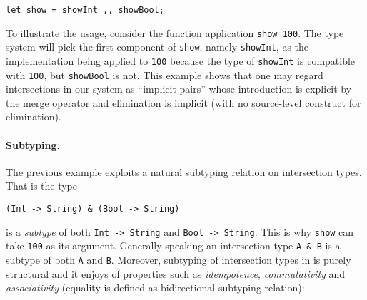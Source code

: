 \begin{lstlisting}
let show = showInt ,, showBool;
\end{lstlisting}

To illustrate the usage, consider the function application \lstinline{show 100}.
The type system will pick the first component of \lstinline{show}, namely
\lstinline{showInt}, as the implementation being applied to \lstinline{100}
because the type of \lstinline{showInt} is compatible with \lstinline{100}, but
\lstinline{showBool} is not. This example shows that one may regard
intersections in our system as ``implicit pairs'' whose introduction is explicit
by the merge operator and elimination is implicit (with no source-level
construct for elimination).








\paragraph{Subtyping.} The previous example exploits a natural
subtyping relation on intersection types. That is the type

\begin{lstlisting}
(Int -> String) & (Bool -> String)
\end{lstlisting}

\noindent is a \emph{subtype} of both \lstinline{Int -> String} and
\lstinline{Bool -> String}. This is why \lstinline{show} can take
\lstinline{100} as its argument. Generally speaking an intersection type
\lstinline{A & B} is a subtype of both \lstinline{A} and \lstinline{B}.
Moreover, subtyping of intersection types in \name is purely structural
and it enjoys of properties such as \emph{idempotence},
\emph{commutativity} and \emph{associativity}
(equality is defined as bidirectional subtyping relation): \\

